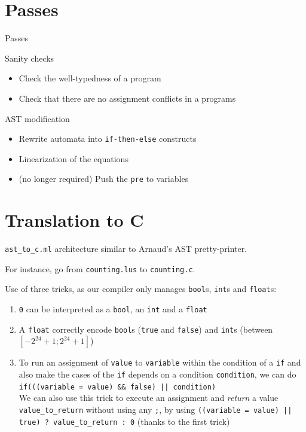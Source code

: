 \documentclass{beamer}
\begin{document}
\section{Passes}
\begin{frame}{Passes}
	\begin{block}{Sanity checks}
		\begin{itemize}
			\item Check the well-typedness of a program
			\item Check that there are no assignment conflicts in a programs
		\end{itemize}
	\end{block}
	\begin{block}{AST modification}
		\begin{itemize}
			\item Rewrite automata into \texttt{if-then-else} constructs
			\item Linearization of the equations
			\item (no longer required) Push the \texttt{pre} to variables
		\end{itemize}
	\end{block}
\end{frame}

\section{Translation to C}
\begin{frame}

	\texttt{ast\_to\_c.ml} architecture similar to Arnaud's AST pretty-printer.

	\pause

	For instance, go from \texttt{counting.lus} to \texttt{counting.c}.

    \pause

	Use of three tricks, as our compiler only manages \texttt{bool}s, \texttt{int}s and \texttt{float}s:
		\begin{enumerate}
			\item \texttt{0} can be interpreted as a \texttt{bool}, an \texttt{int} and a \texttt{float}
			\pause
			\item A \texttt{float} correctly encode \texttt{bool}s (\texttt{true} and \texttt{false}) and \texttt{int}s (between $[-2^{24} + 1; 2^{24} + 1]$)
			\pause
			\item To run an assignment of \texttt{value} to \texttt{variable} within the condition of a \texttt{if} and also make the cases of the \texttt{if} depends on a condition \texttt{condition}, we can do \texttt{if(((variable = value) \&\& false) || condition)}\\
			\pause
			We can also use this trick to execute an assignment and \textit{return} a value \texttt{value\_to\_return} without using any \texttt{;}, by using \texttt{((variable = value) || true) ? value\_to\_return : 0} (thanks to the first trick)
		\end{enumerate}
\end{frame}
\end{document}
